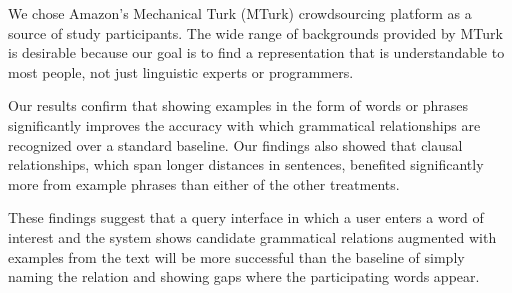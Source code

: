 We chose Amazon's Mechanical Turk (MTurk) crowdsourcing platform as a source of study participants. The wide range of backgrounds provided by MTurk is desirable because our goal is to find a representation that is understandable to most people, not just linguistic experts or programmers.

Our results confirm that showing examples in the form of words or phrases significantly improves the accuracy with which grammatical relationships are recognized over a standard baseline.  Our findings also showed that clausal relationships, which span longer distances in sentences, benefited significantly more from example phrases than either of the other treatments.

These findings suggest that a query interface in which a user enters a word of interest and the system shows candidate grammatical relations augmented with examples from the text will be more successful than the baseline of simply naming the relation and showing gaps where the participating words appear.

%
%
%

